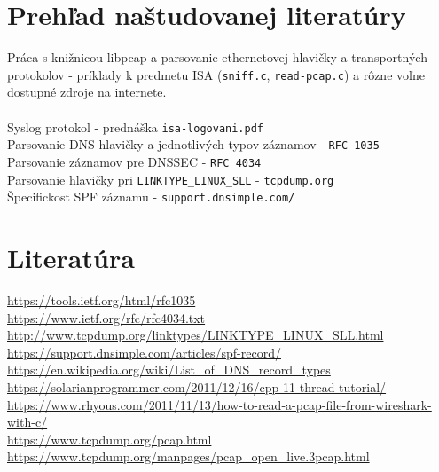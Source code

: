 \documentclass{article}
\begin{document}
    \newpage
    \section{Prehľad naštudovanej literatúry}
        \noindent
        Práca s knižnicou libpcap a parsovanie ethernetovej hlavičky a transportných protokolov - príklady
        k predmetu ISA (\texttt{sniff.c}, \texttt{read-pcap.c}) a rôzne voľne dostupné zdroje na internete.\\\\
        Syslog protokol - prednáška \texttt{isa-logovani.pdf}\\ 
        Parsovanie DNS hlavičky a jednotlivých typov záznamov - \texttt{RFC 1035}\\
        Parsovanie záznamov pre DNSSEC - \texttt{RFC 4034}\\
        Parsovanie hlavičky pri \texttt{LINKTYPE\_LINUX\_SLL} - \texttt{tcpdump.org}\\
        Špecifickost SPF záznamu - \texttt{support.dnsimple.com/}
    
    \section{Literatúra}
    \noindent
    \url{https://tools.ietf.org/html/rfc1035}\\
    \url{https://www.ietf.org/rfc/rfc4034.txt}\\
    \url{http://www.tcpdump.org/linktypes/LINKTYPE_LINUX_SLL.html}\\
    \url{https://support.dnsimple.com/articles/spf-record/}\\
    \url{https://en.wikipedia.org/wiki/List_of_DNS_record_types}\\
    \url{https://solarianprogrammer.com/2011/12/16/cpp-11-thread-tutorial/}\\
    \url{https://www.rhyous.com/2011/11/13/how-to-read-a-pcap-file-from-wireshark-with-c/}\\
    \url{https://www.tcpdump.org/pcap.html}\\
    \url{https://www.tcpdump.org/manpages/pcap_open_live.3pcap.html}\\
\end{document}
